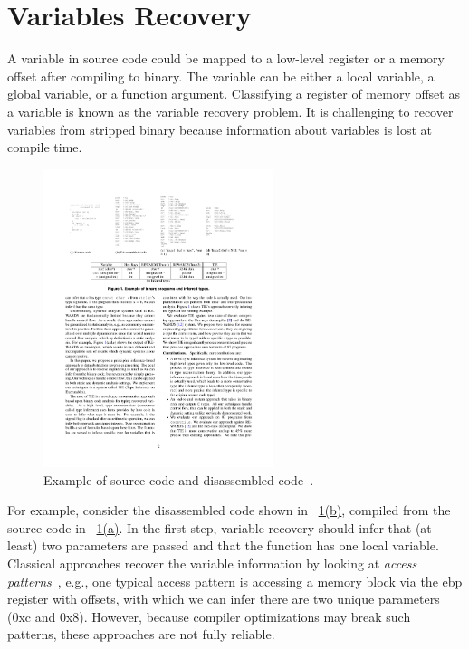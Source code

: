 
\section{Variables Recovery} \label{sec:challenges-variable}
A variable in source code could be mapped to a low-level register or a memory
offset after compiling to binary.
The variable can be either a local variable, a global variable, or a function
argument.
Classifying a register of memory offset as a variable is known as the variable
recovery problem.
It is challenging to recover variables from stripped binary because information
about variables is lost at compile time.

\begin{figure}[tb]
  \centering
  \includegraphics[width=0.6\textwidth]{fig/TIE.pdf}
  \caption{Example of source code and disassembled code~\cite{lee2011tie}.}
  \label{fig:tie}
\end{figure}

For example, consider the disassembled code shown in
\F~\hyperref[fig:tie]{1(b)}, compiled from the source code in
\F~\hyperref[fig:tie]{1(a)}. In the first step, variable recovery should infer
that (at least) two parameters are passed and that the function has one local
variable. Classical approaches recover the variable information by looking at
\textit{access patterns}~\cite{lee2011tie,lin2010automatic}, e.g., one typical
access pattern is accessing a memory block via the ebp register with offsets,
with which we can infer there are two unique parameters (0xc and 0x8).
However, because compiler optimizations may break such patterns, these
approaches are not fully reliable.

